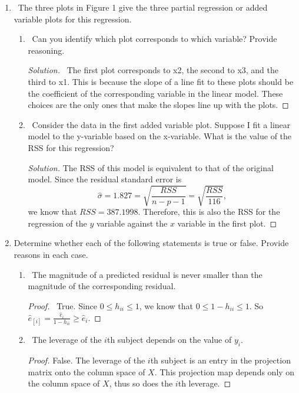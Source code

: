 \documentclass[12pt]{article}
\begin{document}
\begin{enumerate}[leftmargin=0cm,itemindent=.5cm,labelwidth=\itemindent,labelsep=0cm,align=left]
\item \ The three plots in Figure 1 give the three partial regression or added variable plots for this regression.
\begin{enumerate}
\item \ Can you identify which plot corresponds to which variable? Provide reasoning.
\begin{proof}[Solution]
\ The first plot corresponds to x2, the second to x3, and the third to x1.  This is because the slope of a line fit to these plots should be the coefficient of the corresponding variable in the linear model.  These choices are the only ones that make the slopes line up with the plots.
\end{proof}
\item \ Consider the data in the first added variable plot. Suppose I fit a linear model to the y-variable based on the x-variable. What is the value of the RSS for this regression?

\begin{proof}[Solution]
The RSS of this model is equivalent to that of the original model.  Since the residual standard error is
$$
\hat{\sigma} = 1.827 = \sqrt{\frac{RSS}{n-p-1}} = \sqrt{\frac{RSS}{116}},
$$
we know that $RSS = 387.1998$.  Therefore, this is also the RSS for the regression of the $y$ variable against the $x$ variable in the first plot.
\end{proof}

\end{enumerate}

\item Determine whether each of the following statements is true or false.  Provide reasons in each case.

\begin{enumerate}
\item \ The magnitude of a predicted residual is never smaller than the magnitude of the corresponding residual.

\begin{proof}
\ True.  Since $0 \leq h_{ii} \leq 1$, we know that $0 \leq 1 - h_{ii} \leq 1$.  So $\hat{e}_{[i]} = \frac{\hat{e}_i}{1-h_{ii}} \geq \hat{e}_i$.
\end{proof}

\item \ The leverage of the $i$th subject depends on the value of $y_i$.

\begin{proof}
False.  The leverage of the $i$th subject is an entry in the projection matrix onto the column space of $X$.  This projection map depends only on the column space of $X$, thus so does the $i$th leverage.
\end{proof}


\end{enumerate}
\end{enumerate}
\end{document}
